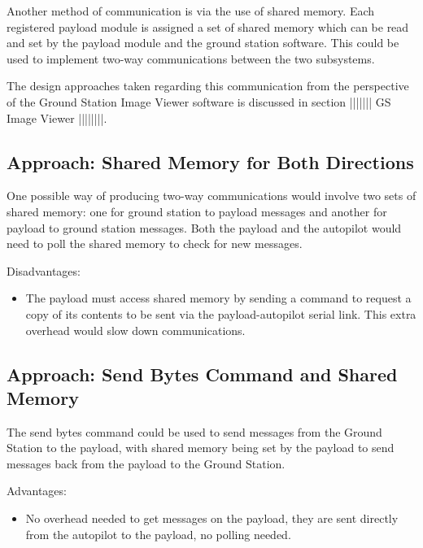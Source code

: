 Another method of communication is via the use of shared memory. Each registered payload module is assigned a set of shared memory which can be read and set by the payload module and the ground station software. This could be used to implement two-way communications between the two subsystems.

The design approaches taken regarding this communication from the perspective of the Ground Station Image Viewer software is discussed in section ||||||| GS Image Viewer ||||||||.

\subsection{Approach: Shared Memory for Both Directions}
One possible way of producing two-way communications would involve two sets of shared memory: one for ground station to payload messages and another for payload to ground station messages. Both the payload and the autopilot would need to poll the shared memory to check for new messages.


Disadvantages:
\begin{itemize}
\item The payload must access shared memory by sending a command to request a copy of its contents to be sent via the payload-autopilot serial link. This extra overhead would slow down communications.
\end{itemize}


\subsection{Approach: Send Bytes Command and Shared Memory}
The send bytes command could be used to send messages from the Ground Station to the payload, with shared memory being set by the payload to send messages back from the payload to the Ground Station.

Advantages:
\begin{itemize}
\item No overhead needed to get messages on the payload, they are sent directly from the autopilot to the payload, no polling needed.
\end{itemize}

